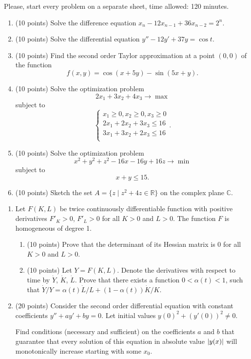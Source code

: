 \documentclass[12pt]{article} %
\theoremstyle{definition} %
\begin{document}
Please, start every problem on a separate sheet, time allowed: 120 minutes.




\begin{enumerate}
  \item (10 points) Solve the difference equation $x_n - 12 x_{n-1} + 36 x_{n-2} = 2^n$.

  \item (10 points) Solve the differential equation $y'' - 12 y' + 37 y = \cos t$.

\item (10 points) 
Find the second order Taylor approximation at a point $(0, 0)$ of the function 
\[
  f(x, y) = \cos(x + 5y) - \sin (5x + y).
\]

\item (10 points) Solve the optimization problem 
\[
2 x_1 + 3 x_2 + 4 x_3 \to \max  
\]
subject to
\[
\begin{cases}
x_1 \geq 0,  x_2 \geq 0, x_3 \geq 0  \\
2 x_1 + 2 x_2 + 3x_3 \leq 16 \\
3 x_1 + 3 x_2 + 2x_3 \leq 16 \\ 
\end{cases}.
\]

\item (10 points) Solve the optimization problem 
\[
x^2 + y^2 + z^2 - 16x - 16y + 16 z \to \min
\]
subject to
\[
x + y \leq 15. 
\]

\item (10 points) Sketch the set $A = \{z \mid z^2 + 4z \in \mathbb R\}$ on the complex plane $\mathbb C$.



\end{enumerate}

\begin{enumerate}[resume]
\item Let $F(K, L)$ be twice continuously differentiable function with positive derivatives $F'_K >0$, $F'_L > 0$ for all $K > 0$ and $L > 0$. 
The function $F$ is homogeneous of degree 1.
\begin{enumerate}
    \item (10 points) Prove that the determinant of its Hessian matrix is 0 for all $K > 0$ and $L > 0$.
    \item (10 points) Let $Y = F(K, L)$. Denote the derivatives with respect to time by $\dot Y$, $\dot K$, $\dot L$. 
    Prove that there exists a function $0 < \alpha(t) < 1$, such that 
    $\dot Y/Y = \alpha(t) \dot L/L + (1-\alpha(t)) \dot K/K$.
\end{enumerate}


\item (20 points) Consider the second order differential equation with constant coefficients $y'' + a y' + by = 0$. 
Let initial values $y(0)^2 + (y'(0))^2 \neq 0$. 

Find conditions (necessary and sufficient) on the coefficients $a$ and $b$ 
that guarantee that every solution of this equation in absolute value $\abs{y(x)}$ 
will monotonically increase starting with some $x_0$.


\end{enumerate}
\end{document}
